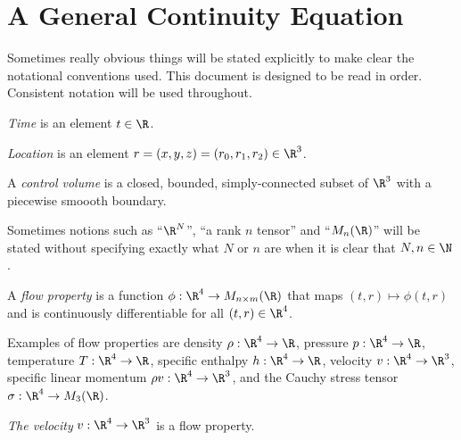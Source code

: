 \section{A General Continuity Equation}

\begin{rk}
Sometimes really obvious things will be stated explicitly to
make clear the notational conventions used.
This document is designed to be read in order.
Consistent notation will be used throughout.
\end{rk}

\begin{df}[Time]
    \emph{Time} is an element $t\in \R$.
\end{df}

\begin{df}[Location]
    \emph{Location} is an element $r=(x,y,z)=(r_0,r_1,r_2)\in \R^3$.
\end{df}

\begin{df}
    A \emph{control volume} is a closed, bounded,
    simply-connected subset of $\R^3$ with a piecewise smoooth boundary.
\end{df}

\begin{rk}
Sometimes notions such as ``$\R^N$'', ``a rank $n$ tensor'' and ``$M_n(\R)$''
will be stated without specifying exactly what $N$ or $n$ are when it
is clear that $N,n\in\N$.
\end{rk}

\begin{df}
A \emph{flow property} is a function
$\phi:\R^4 \to M_{n\times m}(\R)$ that maps $(t,r)\mapsto \phi(t,r)$
and is continuously differentiable for all $(t,r)\in \R^4$.
\end{df}

\begin{rk}
Examples of flow properties are density $\rho:\R^4\to \R$, 
pressure $p:\R^4\to \R$, temperature $T:\R^4\to \R$, specific enthalpy $h:\R^4\to \R$,
velocity $v:\R^4\to \R^3$, specific linear momentum $\rho v:\R^4\to \R^3$, and the Cauchy stress
tensor $\sigma:\R^4\to M_3(\R)$.
\end{rk}

\begin{df}[Velocity]
\emph{The velocity} $v:\R^4\to \R^3$ is a flow property.
\end{df}

